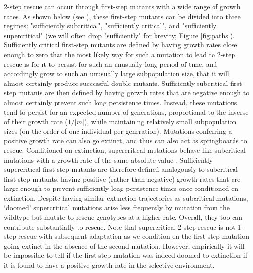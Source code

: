 \documentclass[9pt,twocolumn,twoside,lineno]{gsajnl}
\begin{document}
2-step rescue can occur through first-step mutants with a wide range of growth rates. 
As shown below (see ), these first-step mutants can be divided into three regimes: "sufficiently subcritical", "sufficiently critical", and "sufficiently supercritical" (we will often drop "sufficiently" for brevity; Figure \ref{fig:paths}).  
Sufficiently critical first-step mutants are defined by having growth rates close enough to zero that the most likely way for such a mutation to lead to 2-step rescue is for it to persist for such an unusually long period of time, and accordingly grow to such an unusually large subpopulation size, that it will almost certainly produce successful double mutants.
Sufficiently subcritical first-step mutants are then defined by having growth rates that are negative enough to almost certainly prevent such long persistence times.
Instead, these mutations tend to persist for an expected number of generations, proportional to the inverse of their growth rate ($1/|m|$), while maintaining relatively small subpopulation sizes (on the order of one individual per generation).
Mutations conferring a positive growth rate can also go extinct, and thus can also act as springboards to rescue.
Conditioned on extinction, supercritical mutations behave like subcritical mutations with a growth rate of the same absolute value \citep{maruyama1974note}.
Sufficiently supercritical first-step mutants are therefore defined analogously to subcritical first-step mutants, having positive (rather than negative) growth rates that are large enough to prevent sufficiently long persistence times once conditioned on extinction.
Despite having similar extinction trajectories as subcritical mutations, `doomed' supercritical mutations arise less frequently by mutation from the wildtype but mutate to rescue genotypes at a higher rate.
Overall, they too can contribute substantially to rescue.
Note that supercritical 2-step rescue is not 1-step rescue with subsequent adaptation as we condition on the first-step mutation going extinct in the absence of the second mutation.
However, empirically it will be impossible to tell if the first-step mutation was indeed doomed to extinction if it is found to have a positive growth rate in the selective environment. 
\end{document}
